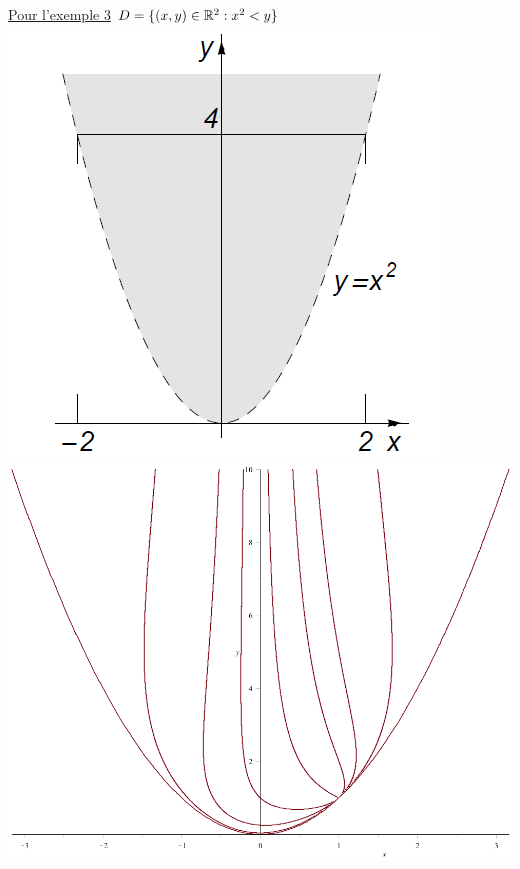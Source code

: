 \documentclass[12pt,a4paper]{article}
\begin{document}
\underline{Pour l'exemple 3} $D = \{(x,y) \in \mathbb{R}^2 : x^2<y\}$ \\
\includegraphics[scale=0.3]{images/domaine_parabole}
\includegraphics[scale=0.2]{images/onion}
\end{document}
